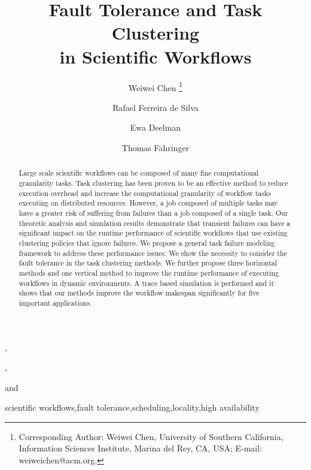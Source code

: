 \documentclass{IOS-Book-Article}
\begin{document}
\begin{frontmatter}              %

\title{Fault Tolerance and Task Clustering\\
 in Scientific Workflows}

\author[A]{{Weiwei} {Chen}%
\thanks{Corresponding Author: Weiwei Chen, University of Southern California, Information Sciences Institute, Marina del Rey, CA, USA; E-mail:
weiweichen@acm.org.}},
\author[A]{Rafael Ferreira de Silva}, 
\author[A]{{Ewa Deelman}}
and 
\author[B]{{Thomas} {Fahringer}}

\address[A]{University of Southern California, Information Sciences Institute, Marina del Rey, CA, USA}
\address[B]{University of Innsbruck, Institute for Computer Science, Innsbruck, Austria}

\begin{abstract}
Large scale scientific workflows can be composed of many fine computational granularity tasks. Task clustering has been proven to be an effective method to reduce execution overhead and increase the computational granularity of workflow tasks executing on distributed resources. However, a job composed of multiple tasks may have a greater risk of suffering from failures than a job composed of a single task. Our theoretic analysis and simulation results demonstrate that transient failures can have a significant impact on the runtime performance of scientific workflows that use existing clustering policies that ignore failures. We propose a general task failure modeling framework to address these performance issues. We show the necessity to consider the fault tolerance in the task clustering methods.  We further propose three horizontal methods and one vertical method to improve the runtime performance of executing workflows in dynamic environments. A trace based simulation is performed and it shows that our methods improve the workflow makespan significantly for five important applications.    
\end{abstract}

\begin{keyword}
scientific workflows\sep fault tolerance\sep scheduling\sep locality\sep high availability 
\end{keyword}
\end{frontmatter}

\thispagestyle{empty}
\pagestyle{empty}
\end{document}

